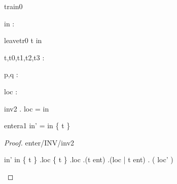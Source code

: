 \documentclass[12pt]{amsart}
\title{}
\author{}
\date{} %
\begin{document}
\maketitle
\tableofcontents


\begin{machine}{train0}


%
	\begin{variable}
		in : \set[\TRAIN]
	\end{variable}
%



\begin{transient}{leave}{tr0}
	t \in in
\end{transient}

\begin{dummy}
	t,t0,t1,t2,t3 : \TRAIN
\end{dummy}

\begin{dummy}
	p,q : \BLK
\end{dummy}


\begin{variable}
	loc : \TRAIN \pfun \BLK
\end{variable}

\begin{invariant}{inv2}
	\dom . loc = in
\end{invariant}

\begin{evassignment}{enter}{a1}
	in' = in \bunion \{ t \}
\end{evassignment}

\begin{proof}{enter/INV/inv2}
	\begin{calculation}
		in'
	\hint{=}{ \ref{a1} }
		in \bunion \{ t \}
	\hint{=}{ \ref{inv2} }
		\dom.loc \bunion \{ t \}
		\dom.loc \bunion \dom.(t \tfun ent)
		\dom.(loc   |   t \tfun ent)
	\hint{=}{ \ref{a2} }
		\dom. ( loc' )
	\end{calculation}
\end{proof}


\end{machine}
\end{document}
